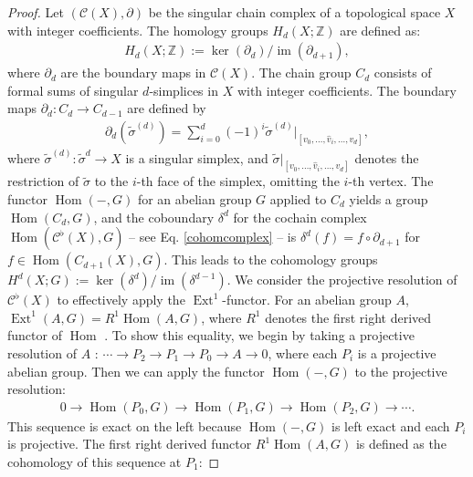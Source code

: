 \begin{proof}
Let $(\mathcal{C}(X),\partial)$ be the singular chain complex of a topological space $X$ with integer coefficients. The homology groups $H_{d}(X; \mathbb{Z})$ are defined as:
\begin{align}
H_{d}(X; \mathbb{Z}) := \ker(\partial_{d}) / \operatorname{im}(\partial_{d+1}),
\end{align}
where $\partial_{d}$ are the boundary maps in $\mathcal{C}(X)$. The chain group $C_{d}$ consists of formal sums of singular $d$-simplices in $X$ with integer coefficients. The boundary maps $\partial_{d}: C_{d} \rightarrow C_{d-1}$ are defined by
\begin{align}
\partial_{d}(\tilde{\sigma}^{(d)}) = \sum_{i=0}^{d}(-1)^{i} \tilde{\sigma}^{(d)}|_{[v_0, \ldots, \hat{v}_i, \ldots, v_d]},
\end{align}
where $\tilde{\sigma}^{(d)}: \tilde{\sigma}^{d} \rightarrow X$ is a singular simplex, and $\tilde{\sigma}|_{[v_0, \ldots, \hat{v}_i, \ldots, v_d]}$ denotes the restriction of $\tilde{\sigma}$ to the $i$-th face of the simplex, omitting the $i$-th vertex. The functor $\operatorname{Hom}(-, G)$ for an abelian group $G$ applied to $C_{d}$ yields a group $\operatorname{Hom}(C_{d}, G)$, and the coboundary $\delta^{d}$ for the cochain complex $\operatorname{Hom}(\mathcal{C}^\flat(X), G)$ -- see Eq. \ref{cohomcomplex} -- is $\delta^{d}(f) = f \circ \partial_{d+1}$ for $f \in \operatorname{Hom}(C_{d+1}(X), G)$. This leads to the cohomology groups $H^{d}(X; G) := \ker(\delta^{d}) / \operatorname{im}(\delta^{d-1})$. We consider the projective resolution of $\mathcal{C}^\flat(X)$ to effectively apply the $\operatorname{Ext}^1$-functor. For an abelian group $A$, $\operatorname{Ext}^{1}(A, G) = R^{1} \operatorname{Hom}(A, G)$, where $R^{1}$ denotes the first right derived functor of $\operatorname{Hom}$ \cite[Vista 3.4.6, \S 3.5]{Weibel1994}. To show this equality, we begin by taking a projective resolution of $A$ \cite[Definition 2.2.4]{Weibel1994}: $\cdots \to P_{2} \to P_{1} \to P_{0} \to A \to 0$, where each $P_{i}$ is a projective abelian group. Then we can apply the functor $\operatorname{Hom}(-, G)$ to the projective resolution:
\begin{align}
0 \to \operatorname{Hom}(P_{0}, G) \to \operatorname{Hom}(P_{1}, G) \to \operatorname{Hom}(P_{2}, G) \to \cdots.
\end{align}
This sequence is exact on the left because $\operatorname{Hom}(-, G)$ is left exact and each $P_{i}$ is projective. The first right derived functor $R^{1}\operatorname{Hom}(A, G)$ is defined as the cohomology of this sequence at $P_{1}$:

\end{proof}
